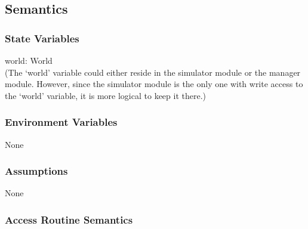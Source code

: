 \documentclass[12pt, titlepage]{article}
\begin{document}
\subsection{Semantics}

\subsubsection{State Variables}

world: World \\
(The `world' variable could either reside in the simulator module or the manager module. 
However, since the simulator module is the only one with write access to 
the `world' variable, it is more logical to keep it there.)


\subsubsection{Environment Variables}

None

\subsubsection{Assumptions}

None

\subsubsection{Access Routine Semantics}
\end{document}
